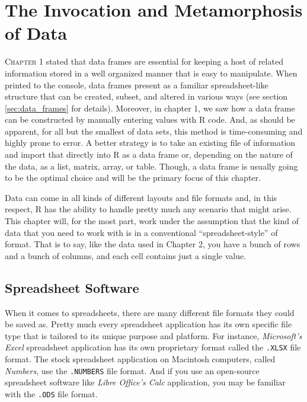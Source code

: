 \chapter{The Invocation and Metamorphosis of Data}

\lettrine{C}{hapter} 1 stated that data frames are essential for keeping a host of related information stored in a well organized manner that is easy to manipulate. When printed to the console, data frames present as a familiar spreadsheet-like structure that can be created, subset, and altered in various ways (see section \ref{sec:data_frames} for details). Moreover, in chapter 1, we saw how a data frame can be constructed by manually entering values with R code. And, as should be apparent, for all but the smallest of data sets, this method is time-consuming and highly prone to error. A better strategy is to take an existing file of information and import that directly into R as a data frame or, depending on the nature of the data, as a list, matrix, array, or table. Though, a data frame is usually going to be the optimal choice and will be the primary focus of this chapter.

Data can come in all kinds of different layouts and file formats and, in this respect, R has the ability to handle pretty much any scenario that might arise. This chapter will, for the most part, work under the assumption that the  kind of data that you need to work with is in a conventional ``spreadsheet-style'' of format. That is to say, like the  data used in Chapter 2, you have a bunch of rows and a bunch of columns, and each cell contains just a single value.

\section{Spreadsheet Software}
\label{sec:spreadsheet_soft}

When it comes to spreadsheets, there are many different file formats they could be saved as.  Pretty much every spreadsheet application has its own specific file type that is tailored to its unique purpose and platform. For instance, \textit{Microsoft's Excel} spreadsheet application has its own proprietary format called the \texttt{.XLSX} file format. The stock spreadsheet application on Macintosh computers, called \textit{Numbers}, use the \texttt{.NUMBERS} file format. And if you use an open-source spreadsheet software like \textit{Libre Office's Calc} application, you may be familiar with the \texttt{.ODS} file format.

